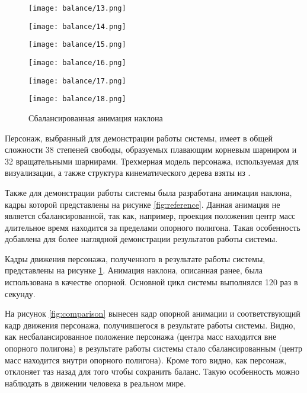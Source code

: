\begin{figure}
\begin{minipage}{0.325\textwidth}
    \centering
    \texttt{[image: balance/13.png]}
  \end{minipage}
  \begin{minipage}{0.325\textwidth}
    \centering
    \texttt{[image: balance/14.png]}
  \end{minipage}
  \begin{minipage}{0.325\textwidth}
    \centering
    \texttt{[image: balance/15.png]}
  \end{minipage}
  \vfill
  \hfill
  \begin{minipage}{0.325\textwidth}
    \centering
    \texttt{[image: balance/16.png]}
  \end{minipage}
  \begin{minipage}{0.325\textwidth}
    \centering
    \texttt{[image: balance/17.png]}
  \end{minipage}
  \begin{minipage}{0.325\textwidth}
    \centering
    \texttt{[image: balance/18.png]}
  \end{minipage}
  \caption{Сбалансированная анимация наклона}
  \label{fig:result}
\end{figure}

Персонаж, выбранный для демонстрации работы системы, имеет в общей сложности 38 степеней свободы, образуемых плавающим корневым шарниром и 32 вращательными шарнирами. Трехмерная модель персонажа, используемая для визуализации, а также структура кинематического дерева взяты из \cite{TALOS}.

Также для демонстрации работы системы была разработана анимация наклона, кадры которой представлены на рисунке \ref{fig:reference}. Данная анимация не является сбалансированной, так как, например, проекция положения центр масс длительное время находится за пределами опорного полигона. Такая особенность добавлена для более наглядной демонстрации результатов работы системы.

Кадры движения персонажа, полученного в результате работы системы, представлены на рисунке \ref{fig:result}. Анимация наклона, описанная ранее, была использована в качестве опорной. Основной цикл системы выполнялся 120 раз в секунду.

На рисунок \ref{fig:comparison} вынесен кадр опорной анимации и соответствующий кадр движения персонажа, получившегося в результате работы системы. Видно, как несбалансированное положение персонажа (центра масс находится вне опорного полигона) в результате работы системы стало сбалансированным (центр масс находится внутри опорного полигона). Кроме того видно, как персонаж, отклоняет таз назад для того чтобы сохранить баланс. Такую особенность можно наблюдать в движении человека в реальном мире.

